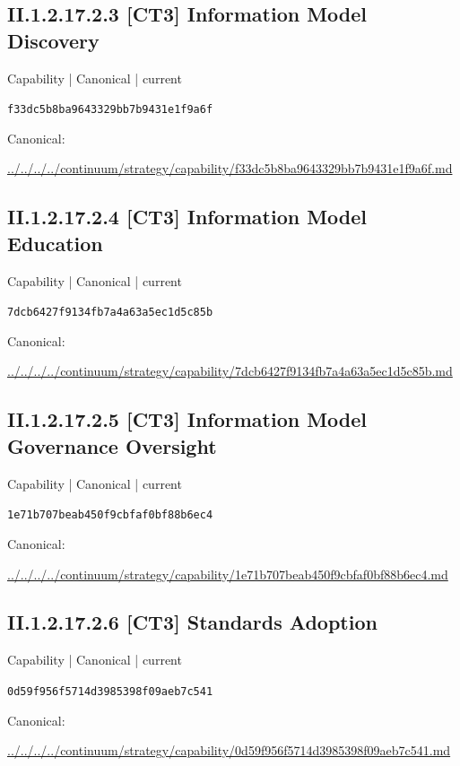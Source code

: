 \documentclass[10pt,a4paper]{article}
\begin{document}
\subsection*{II.1.2.17.2.3 [CT3] Information Model Discovery}
\label{element-f33dc5b8ba9643329bb7b9431e1f9a6f}
{\small Capability | Canonical | current}\par
\texttt{f33dc5b8ba9643329bb7b9431e1f9a6f}\par
Canonical: \par
{\footnotesize\url{../../../../continuum/strategy/capability/f33dc5b8ba9643329bb7b9431e1f9a6f.md}}\par
\subsection*{II.1.2.17.2.4 [CT3] Information Model Education}
\label{element-7dcb6427f9134fb7a4a63a5ec1d5c85b}
{\small Capability | Canonical | current}\par
\texttt{7dcb6427f9134fb7a4a63a5ec1d5c85b}\par
Canonical: \par
{\footnotesize\url{../../../../continuum/strategy/capability/7dcb6427f9134fb7a4a63a5ec1d5c85b.md}}\par
\subsection*{II.1.2.17.2.5 [CT3] Information Model Governance Oversight}
\label{element-1e71b707beab450f9cbfaf0bf88b6ec4}
{\small Capability | Canonical | current}\par
\texttt{1e71b707beab450f9cbfaf0bf88b6ec4}\par
Canonical: \par
{\footnotesize\url{../../../../continuum/strategy/capability/1e71b707beab450f9cbfaf0bf88b6ec4.md}}\par
\subsection*{II.1.2.17.2.6 [CT3] Standards Adoption}
\label{element-0d59f956f5714d3985398f09aeb7c541}
{\small Capability | Canonical | current}\par
\texttt{0d59f956f5714d3985398f09aeb7c541}\par
Canonical: \par
{\footnotesize\url{../../../../continuum/strategy/capability/0d59f956f5714d3985398f09aeb7c541.md}}\par
\end{document}
